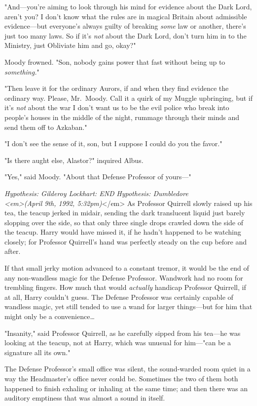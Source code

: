 "And---you're aiming to look through his mind for evidence about the Dark Lord, aren't you? I don't know what the rules are in magical Britain about admissible evidence---but everyone's always guilty of breaking \emph{some} law or another, there's just too many laws. So if it's \emph{not} about the Dark Lord, don't turn him in to the Ministry, just Obliviate him and go, okay?"

Moody frowned. "Son, nobody gains power that fast without being up to \emph{something.}"

"Then leave it for the ordinary Aurors, if and when they find evidence the ordinary way. Please, Mr.~Moody. Call it a quirk of my Muggle upbringing, but if it's \emph{not} about the war I don't want us to be the evil police who break into people's houses in the middle of the night, rummage through their minds and send them off to Azkaban."

"I don't see the sense of it, son, but I suppose I could do you the favor."

"Is there aught else, Alastor?" inquired Albus.

"Yes," said Moody. "About that Defense Professor of yours---"

\emph{Hypothesis: Gilderoy Lockhart: END}
\sbreak
\emph{Hypothesis: Dumbledore\\
<em>(April 9th, 1992, 5:32pm)}</em>
\sbreak
As Professor Quirrell slowly raised up his tea, the teacup jerked in midair, sending the dark translucent liquid just barely slopping over the side, so that only three single drops crawled down the side of the teacup. Harry would have missed it, if he hadn't happened to be watching closely; for Professor Quirrell's hand was perfectly steady on the cup before and after.

If that small jerky motion advanced to a constant tremor, it would be the end of any non-wandless magic for the Defense Professor. Wandwork had no room for trembling fingers. How much that would \emph{actually} handicap Professor Quirrell, if at all, Harry couldn't guess. The Defense Professor was certainly capable of wandless magic, yet still tended to use a wand for larger things---but for him that might only be a convenience{\ldots}

"Insanity," said Professor Quirrell, as he carefully sipped from his tea---he was looking at the teacup, not at Harry, which was unusual for him---"can be a signature all its own."

The Defense Professor's small office was silent, the sound-warded room quiet in a way the Headmaster's office never could be. Sometimes the two of them both happened to finish exhaling or inhaling at the same time; and then there was an auditory emptiness that was almost a sound in itself.

